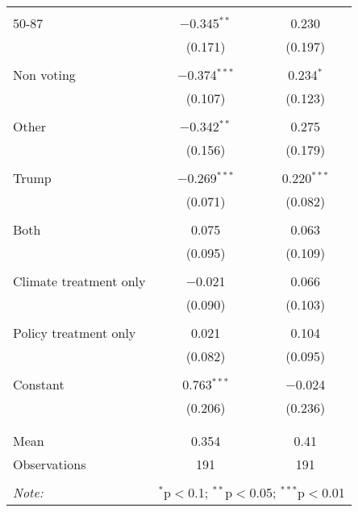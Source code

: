 \begin{tabular}{@{\extracolsep{5pt}}lcc}
  & & \\ 
 50-87 & $-$0.345$^{**}$ & 0.230 \\ 
  & (0.171) & (0.197) \\ 
  & & \\ 
 Non voting & $-$0.374$^{***}$ & 0.234$^{*}$ \\ 
  & (0.107) & (0.123) \\ 
  & & \\ 
 Other & $-$0.342$^{**}$ & 0.275 \\ 
  & (0.156) & (0.179) \\ 
  & & \\ 
 Trump & $-$0.269$^{***}$ & 0.220$^{***}$ \\ 
  & (0.071) & (0.082) \\ 
  & & \\ 
 Both & 0.075 & 0.063 \\ 
  & (0.095) & (0.109) \\ 
  & & \\ 
 Climate treatment only & $-$0.021 & 0.066 \\ 
  & (0.090) & (0.103) \\ 
  & & \\ 
 Policy treatment only & 0.021 & 0.104 \\ 
  & (0.082) & (0.095) \\ 
  & & \\ 
 Constant & 0.763$^{***}$ & $-$0.024 \\ 
  & (0.206) & (0.236) \\ 
  & & \\ 
\hline \\[-1.8ex] 
Mean & 0.354 & 0.41 \\ 
Observations & 191 & 191 \\ 
\hline 
\hline \\[-1.8ex] 
\textit{Note:}  & \multicolumn{2}{r}{$^{*}$p$<$0.1; $^{**}$p$<$0.05; $^{***}$p$<$0.01} \\ 
\end{tabular} 
